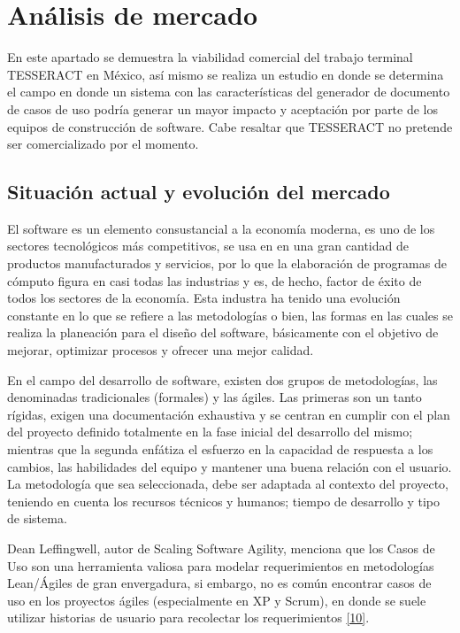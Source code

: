 \chapter{Análisis de mercado} \label{cap:cuatro}

En este apartado se demuestra la viabilidad comercial del trabajo terminal TESSERACT en México, así mismo se realiza un estudio en donde se determina el campo en donde un sistema con las características del generador de documento de casos de uso podría generar un mayor impacto y aceptación por parte de los equipos de construcción de software. Cabe resaltar que TESSERACT no pretende ser comercializado por el momento.

\section{Situación actual  y evolución del mercado}

El software es un elemento consustancial a la economía moderna, es uno de los sectores tecnológicos más competitivos, se usa en en una gran cantidad de productos manufacturados y servicios, por lo que  la elaboración de programas de cómputo figura en casi todas las industrias y es, de hecho, factor de éxito de todos los sectores de la economía. Esta industra ha tenido una evolución constante en lo que se refiere a las metodologías o bien, las formas en las cuales se realiza la planeación para el diseño del software, básicamente con el objetivo de mejorar, optimizar procesos y ofrecer una mejor calidad.

En el campo del desarrollo de software, existen dos grupos de metodologías, las denominadas tradicionales (formales) y las ágiles. Las primeras son un tanto rígidas, exigen una documentación exhaustiva y se centran en cumplir con el plan del proyecto definido totalmente en la fase inicial del desarrollo del mismo; mientras que la segunda enfátiza el esfuerzo en la capacidad de respuesta a los cambios, las habilidades del equipo y mantener una buena relación con el usuario. La metodología que sea seleccionada, debe ser adaptada al contexto del proyecto, teniendo en cuenta los recursos técnicos y humanos; tiempo de desarrollo y tipo de sistema.

Dean Leffingwell, autor de Scaling Software Agility, menciona que los Casos de Uso son una herramienta valiosa para modelar requerimientos en metodologías Lean/Ágiles de gran envergadura, si embargo, no es común encontrar casos de uso en los proyectos ágiles (especialmente en XP y Scrum), en donde se suele utilizar historias de usuario para recolectar los requerimientos \hyperlink{b10}{[10]}.

